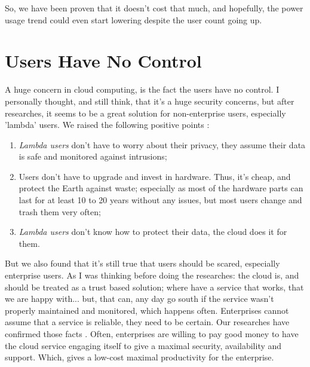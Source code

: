 \documentclass[final, a4paper, 9.5pt]{article}
\begin{document}
\begin{multicols}{2}
\columnbreak

\vspace*{\fill}

So, we have been proven that it doesn't cost that much, and hopefully, the power usage trend could even start lowering despite the user count going up.

\section*{Users Have No Control}
A huge concern in cloud computing, is the fact the users have no control. I personally thought, and still think, that it's a huge security concerns, but after researches, it seems to be a great solution for non-enterprise users, especially 'lambda' users. We raised the following positive points \cite{good_bad_ugly}:

\begin{enumerate}
    \item \emph{Lambda users} don't have to worry about their privacy, they assume their data is safe and monitored against intrusions;
    \item Users don't have to upgrade and invest in hardware. Thus, it's cheap, and protect the Earth against waste; especially as most of the hardware parts can last for at least 10 to 20 years without any issues, but most users change and trash them very often;
    \item \emph{Lambda users} don't know how to protect their data, the cloud does it for them.
\end{enumerate}

But we also found that it's still true that users should be scared, especially enterprise users. As I was thinking before doing the researches: the cloud is, and should be treated as a trust based solution; where have a service that works, that we are happy with... but, that can, any day go south if the service wasn't properly maintained and monitored, which happens often. Enterprises cannot assume that a service is reliable, they need to be certain. Our researches have confirmed those facts \cite{the_ugly}. Often, enterprises are willing to pay good money to have the cloud service engaging itself to give a maximal security, availability and support. Which, gives a low-cost maximal productivity for the enterprise.

\vspace*{\fill}

\end{multicols}
\end{document}
